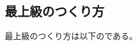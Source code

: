 \makeatletter
\renewcommand{\compareexrow}[2]{%
  \par\vspace{0.24em}%
  \noindent
  \begin{tabular}[t]{@{}p{\compareexwd}@{\hspace{\compareexgap}}p{\compareexwd}@{}}#1 & #2 \\ \end{tabular}%
  \par\vspace{0.1em}%
}
\renewcommand{\dialogueblankprac}[1]{%
  \par\vspace{0.1em}%
  \noindent
  \ifshowanswer
    \fitblank@withspaces{\underline{\makebox[\linewidth][l]{\hspace{0.35em}{\color{blue}\small #1}\hspace{0.35em}}}}%
  \else
    \fitblank@withspaces{\underline{\makebox[\linewidth][l]{\hspace{0.35em}{\small\phantom{#1}}\hspace{0.35em}}}}%
  \fi
  \par\vspace{0.1em}%
}
\makeatother
\subsection{最上級のつくり方}
    最上級のつくり方は以下のである。

